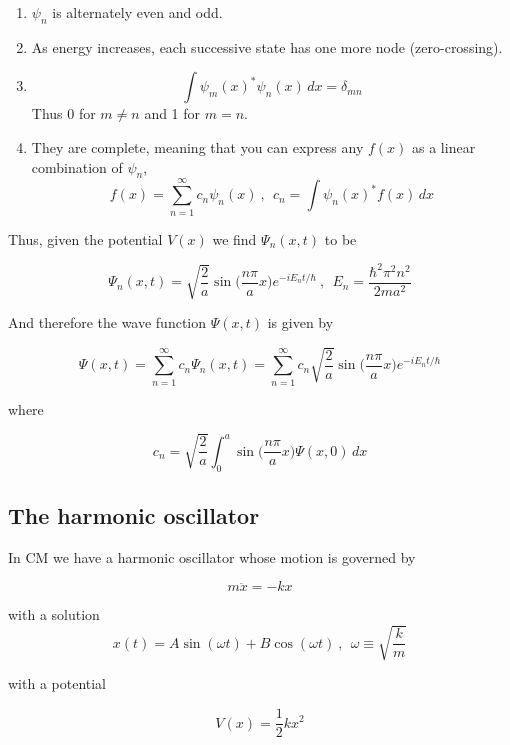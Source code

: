 \documentclass[a4paper]{article}
\begin{document}
\begin{enumerate}
	\item $\psi_n$ is alternately even and odd.
	\item As energy increases, each successive state has one more node (zero-crossing).
	\item $$\int\psi_m(x)^*\psi_n(x)\,dx=\delta_{mn}$$ Thus 0 for $m\not=n$ and 1 for $m=n$.
	\item They are complete, meaning that you can express any $f(x)$ as a linear combination of $\psi_n$, $$f(x)=\sum_{n=1}^{\infty}c_n\psi_n(x)\ , \ \ c_n=\int\psi_n(x)^*f(x)\,dx$$
\end{enumerate}

Thus, given the potential $V(x)$ we find $\Psi_n(x, t)$ to be

\begin{equation}
	\Psi_n(x,t)=\sqrt{\frac{2}{a}}\sin\bigg(\frac{n\pi}{a}x\bigg)e^{-iE_nt/\hbar}\ , \ \ E_n=\frac{\hbar^2\pi^2n^2}{2ma^2}
\end{equation}

And therefore the wave function $\Psi(x, t)$ is given by

\begin{equation}
\Psi(x,t)=\sum_{n=1}^{\infty}c_n\Psi_n(x,t)=\sum_{n=1}^{\infty}c_n\sqrt{\frac{2}{a}}\sin\bigg(\frac{n\pi}{a}x\bigg)e^{-iE_nt/\hbar}
\end{equation}

where

\begin{equation}
	c_n=\sqrt{\frac{2}{a}}\int_0^a\sin\bigg(\frac{n\pi}{a}x\bigg)\Psi(x,0)\,dx
\end{equation}

\subsection{The harmonic oscillator}

In CM we have a harmonic oscillator whose motion is governed by

\begin{equation}
	m\ddot{x}=-kx
\end{equation}

with a solution
\begin{equation}
	x(t)=A\sin(\omega t)+B\cos(\omega t)\ , \ \ \omega\equiv\sqrt{\frac{k}{m}}
\end{equation}

with a potential 

\begin{equation}
	V(x)=\frac{1}{2}kx^2
\end{equation}
\end{document}
